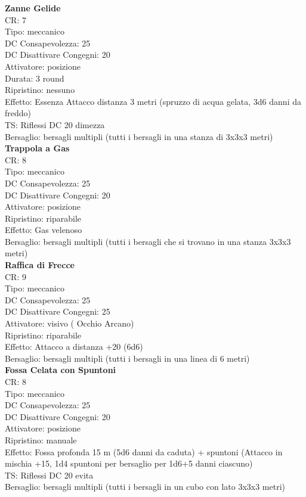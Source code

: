\documentclass[a4paper,11pt,twoside,openany]{dndbook}
\begin{document}
{\begin{multicols}{2}
\textbf{Zanne Gelide}\\
CR: 7 \\
Tipo: meccanico \\
DC Consapevolezza: 25 \\
DC Disattivare Congegni: 20 \\
Attivatore: posizione \\
Durata: 3 round \\
Ripristino: nessuno \\
Effetto: Essenza Attacco distanza 3 metri (spruzzo di acqua gelata, 3d6 danni da freddo) \\
TS: Riflessi DC 20 dimezza \\
Bersaglio: bersagli multipli (tutti i bersagli in una stanza di 3x3x3 metri)\\

\textbf{Trappola a Gas}\\
CR: 8 \\
Tipo: meccanico \\
DC Consapevolezza: 25 \\
DC Disattivare Congegni: 20 \\
Attivatore: posizione \\
Ripristino: riparabile \\
Effetto: Gas velenoso \\
Bersaglio: bersagli multipli (tutti i bersagli che si trovano in una stanza 3x3x3 metri)\\

\textbf{Raffica di Frecce}\\
CR: 9 \\
Tipo: meccanico \\
DC Consapevolezza: 25 \\
DC Disattivare Congegni: 25 \\
Attivatore: visivo ( Occhio Arcano) \\
Ripristino: riparabile \\
Effetto: Attacco a distanza +20 (6d6) \\
Bersaglio: bersagli multipli (tutti i bersagli in una linea di 6 metri)\\

\textbf{Fossa Celata con Spuntoni}\\
CR: 8 \\
Tipo: meccanico \\
DC Consapevolezza: 25 \\
DC Disattivare Congegni: 20 \\
Attivatore: posizione \\
Ripristino: manuale \\
Effetto: Fossa profonda 15 m (5d6 danni da caduta) + spuntoni (Attacco in mischia +15, 1d4 spuntoni per bersaglio per 1d6+5 danni ciascuno) \\
TS: Riflessi DC 20 evita \\
Bersaglio: bersagli multipli (tutti i bersagli in un cubo con lato 3x3x3 metri)\\


\end{multicols}}
\end{document}
